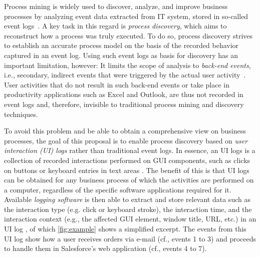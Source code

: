 \label{sec:startingpoint}

Process mining is widely used to discover, analyze, and improve business processes 
by analyzing event data extracted from IT system, stored in so-called event logs~\cite{van2016data}.
A key task in this regard is \emph{process discovery}, which aims to reconstruct how a process was truly executed. To do so, process discovery strives to establish an accurate process model on the basis of the recorded behavior captured in an event log.
Using such event logs as basis for discovery has an important limitation, however: It limits the scope of analysis to \textit{back-end events}, i.e., secondary, indirect events that were triggered by the actual user activity~\cite{diba2020extraction}. User activities that do not result in such back-end events or take place in productivity applications such as Excel and Outlook, are thus not recorded in event logs and, therefore, invisible to traditional process mining and discovery techniques. 

To avoid this problem and be able to obtain a comprehensive view on business processes, the goal of this proposal is to enable
process discovery based on \textit{user interaction (UI) logs} rather than traditional event logs. In essence, an UI logs is a collection of recorded interactions performed on GUI components, such as clicks on buttons or keyboard entries in text areas \cite{Urabe21}. The benefit of this is that UI logs
can be obtained for any business process of which the activities are performed on a computer, regardless of the specific software applications required for it.
Available \textit{logging software} is then able to extract and store relevant data such as the interaction type (e.g. click or keyboard stroke), the interaction time, and the interaction context (e.g., the affected GUI element, window title, URL, etc.) in an UI log  \cite{leno2019action}, of which 
\autoref{fig:example} shows a simplified excerpt.
The events from this UI log show how a user receives orders via e-mail (cf., events 1 to 3) and proceeds to handle them in Salesforce's web application (cf., events 4 to 7).


